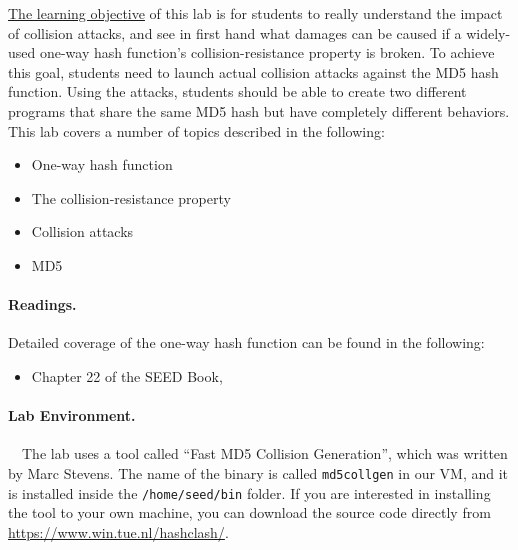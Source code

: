 \underline{The learning objective} of this lab is for students to really
understand the impact of collision attacks, and see in first hand what
damages can be caused if a widely-used one-way hash function's
collision-resistance property is broken. To achieve this goal, students
need to launch actual collision attacks against the MD5 hash function.
Using the attacks, students should be able to create two different programs
that share the same MD5 hash but have completely different behaviors.
This lab covers a number of topics described in the following:

\begin{itemize}[noitemsep]
\item One-way hash function
\item The collision-resistance property
\item Collision attacks
\item MD5
\end{itemize}


\paragraph{Readings.}
Detailed coverage of the one-way hash function can be found in the following:

\begin{itemize}
\item Chapter 22 of the SEED Book, \seedbook
\end{itemize}



\paragraph{Lab Environment.} \seedenvironment \ \ 
The lab uses a tool 
called ``Fast MD5 Collision Generation'', which was written by Marc Stevens. 
The name of the binary is called \texttt{md5collgen} in our VM, and it is 
installed inside the \texttt{/home/seed/bin} folder.
If you are interested in installing the tool to your own machine, you
can download the source code directly from
\url{https://www.win.tue.nl/hashclash/}.



